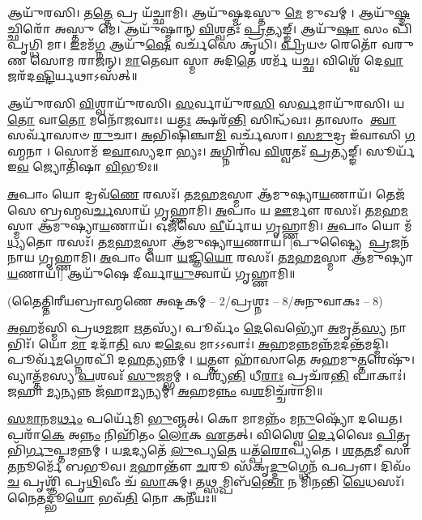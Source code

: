 𑌆𑌯𑍁᳴𑌰𑌸𑌿।
𑌤\-\ul{𑌤𑍍𑌤𑍇} 𑌪𑍍𑌰 𑌯᳴𑌚𑍍𑌛𑌾𑌮𑌿।
𑌆𑌯𑍁᳴𑌷𑍍𑌮𑌦𑌸𑍍𑌤𑍁 \ul{𑌮𑍇} 𑌮𑍁𑌖𑌮𑍍।
𑌆𑌯𑍁᳴\-\ul{𑌷𑍍𑌮}\-𑌚𑍍𑌛𑌿𑌰𑍋᳴ 𑌅𑌸𑍍𑌤𑍁 𑌮𑍇।
𑌆𑌯𑍁᳴𑌷𑍍𑌮𑌾𑌨𑍍 \ul{𑌵𑌿}\-𑌶𑍍𑌵𑌤𑌃᳴ \ul{𑌪𑍍𑌰}\-𑌤𑍍𑌯𑌙𑍍𑌙𑍍।
𑌆𑌯𑍁᳴\-\ul{𑌷𑌾} 𑌸𑌂 𑌪𑌿᳴𑌪𑍃𑌗𑍍𑌧𑌿 𑌮𑌾।
\-\ul{𑌇}\-𑌮𑌮᳴\-\ul{𑌗𑍍𑌨} 𑌆𑌯𑍁᳴\-\ul{𑌷𑍇} 𑌵𑌰𑍍𑌚᳴𑌸𑍇 𑌕𑍃𑌧𑌿।
\-\ul{𑌪𑍍𑌰𑌿}\-𑌯𑍞 𑌰𑍇𑌤𑍋᳴ 𑌵𑌰𑍁𑌣 𑌸𑍋𑌮 𑌰𑌾𑌜𑌨𑍍।
\-\ul{𑌮𑌾}\-𑌤𑍇𑌵𑌾𑌸𑍍𑌮𑌾 𑌅𑌦𑌿\-\ul{𑌤𑍇} 𑌶𑌰𑍍𑌮᳴ 𑌯𑌚𑍍𑌛।
𑌵𑌿𑌶𑍍𑌵𑍇᳴ 𑌦𑍇\-\ul{𑌵𑌾} 𑌜𑌰᳴𑌦\-\ul{𑌷𑍍𑌟𑌿}\-𑌰𑍍𑌯𑌥𑌾𑌽𑌸᳴𑌤𑍍॥

𑌆𑌯𑍁᳴𑌰𑌸𑌿 \ul{𑌵𑌿}\-𑌶𑍍𑌵𑌾𑌯𑍁᳴𑌰𑌸𑌿।
\-\ul{𑌸}\-𑌰𑍍𑌵𑌾𑌯𑍁᳴𑌰\-\ul{𑌸𑌿} 𑌸\-\ul{𑌰𑍍𑌵}\-𑌮𑌾𑌯𑍁᳴𑌰𑌸𑌿।
𑌯\-\ul{𑌤𑍋} 𑌵𑌾\-\ul{𑌤𑍋} 𑌮𑌨𑍋᳴𑌜𑌵𑌾𑌃।
𑌯\-\ul{𑌤𑌃} 𑌕𑍍𑌷𑌰᳴\-\ul{𑌨𑍍𑌤𑌿} 𑌸𑌿𑌨𑍍𑌧᳴𑌵𑌃।
𑌤𑌾𑌸𑌾𑌂 \ul{𑌤𑍍𑌵𑌾} 𑌸𑌰𑍍𑌵𑌾᳴𑌸𑌾𑍞 \ul{𑌰𑍁}\-𑌚𑌾।
\-\ul{𑌅}\-𑌭𑌿𑌷𑌿᳴𑌞𑍍𑌚𑌾\-\ul{𑌮𑌿} 𑌵𑌰𑍍𑌚᳴𑌸𑌾।
\-\ul{𑌸}\-\-\ul{𑌮𑍁}\-𑌦𑍍𑌰 𑌇᳴𑌵𑌾𑌸𑌿 \ul{𑌗}\-𑌹𑍍𑌮𑌨𑌾।
𑌸𑍋𑌮᳴ 𑌇\-\ul{𑌵𑌾}\-𑌸𑍍𑌯𑌦𑌾𑌭𑍍𑌯𑌃।
\-\ul{𑌅}\-𑌗𑍍𑌨𑌿𑌰𑌿᳴𑌵 \ul{𑌵𑌿}\-𑌶𑍍𑌵𑌤𑌃᳴ \ul{𑌪𑍍𑌰}\-𑌤𑍍𑌯𑌙𑍍𑌙𑍍।
𑌸𑍂𑌰𑍍𑌯᳴ 𑌇\-\ul{𑌵} 𑌜𑍍𑌯𑍋𑌤𑌿᳴𑌷𑌾 \ul{𑌵𑌿}\-𑌭𑍂𑌃॥


\-\ul{𑌅}\-𑌪𑌾𑌂 𑌯𑍋 𑌦𑍍𑌰𑌵᳴\-\ul{𑌣𑍇} 𑌰𑌸𑌃᳴।
𑌤\-\ul{𑌮}\-𑌹\-\ul{𑌮}\-𑌸𑍍𑌮𑌾 𑌆᳴𑌮𑍁𑌷𑍍𑌯𑌾\-\ul{𑌯}\-𑌣𑌾𑌯᳴।
𑌤𑍇𑌜᳴𑌸𑍇 𑌬𑍍𑌰𑌹𑍍𑌮𑌵\-\ul{𑌰𑍍𑌚}\-𑌸𑌾𑌯᳴ 𑌗𑍃𑌹𑍍𑌣𑌾𑌮𑌿।
\-\ul{𑌅}\-𑌪𑌾𑌂 𑌯 \ul{𑌊}\-𑌰𑍍𑌮𑍗 𑌰𑌸𑌃᳴।
𑌤\-\ul{𑌮}\-𑌹\-\ul{𑌮}\-𑌸𑍍𑌮𑌾 𑌆᳴𑌮𑍁𑌷𑍍𑌯𑌾\-\ul{𑌯}\-𑌣𑌾𑌯᳴।
𑌓𑌜᳴𑌸𑍇 \ul{𑌵𑍀}\-𑌰𑍍𑌯𑌾᳴𑌯 𑌗𑍃𑌹𑍍𑌣𑌾𑌮𑌿।
\-\ul{𑌅}\-𑌪𑌾𑌂 𑌯𑍋 𑌮᳴\-\ul{𑌧𑍍𑌯}\-𑌤𑍋 𑌰𑌸𑌃᳴।
𑌤\-\ul{𑌮}\-𑌹\-\ul{𑌮}\-𑌸𑍍𑌮𑌾 𑌆᳴𑌮𑍁𑌷𑍍𑌯𑌾\-\ul{𑌯}\-𑌣𑌾𑌯᳴।
[𑌪𑍁𑌷𑍍𑌟𑍍𑌯𑍈 \ul{𑌪𑍍𑌰}\-𑌜𑌨᳴𑌨𑌾𑌯 𑌗𑍃𑌹𑍍𑌣𑌾𑌮𑌿।
\-\ul{𑌅}\-𑌪𑌾𑌂 𑌯𑍋 \ul{𑌯}\-𑌜𑍍𑌞𑌿\-\ul{𑌯𑍋} 𑌰𑌸𑌃᳴।
𑌤\-\ul{𑌮}\-𑌹\-\ul{𑌮}\-𑌸𑍍𑌮𑌾 𑌆᳴𑌮𑍁𑌷𑍍𑌯𑌾\-\ul{𑌯}\-𑌣𑌾𑌯᳴।]
𑌆𑌯𑍁᳴𑌷𑍇 𑌦𑍀𑌰𑍍𑌘𑌾\-\ul{𑌯𑍁}\-𑌤𑍍𑌵𑌾𑌯᳴ 𑌗𑍃𑌹𑍍𑌣𑌾𑌮𑌿॥

\centerline{\scriptsize (𑌤𑍈𑌤𑍍𑌤𑌿𑌰𑍀𑌯𑌬𑍍𑌰𑌾𑌹𑍍𑌮𑌣𑍇 𑌅𑌷𑍍𑌟𑌕𑌮𑍍 – 2/𑌪𑍍𑌰𑌶𑍍𑌨𑌃 – 8/𑌅𑌨𑍁𑌵𑌾𑌕𑌃 – 8)}
\-\ul{𑌅}\-𑌹𑌮᳴𑌸𑍍𑌮𑌿 𑌪𑍍𑌰𑌥\-\ul{𑌮}\-𑌜𑌾 \ul{𑌋}\-𑌤𑌸𑍍𑌯᳴।
𑌪𑍂𑌰𑍍𑌵𑌂᳴ \ul{𑌦𑍇}\-𑌵𑍇𑌭𑍍𑌯𑍋᳴ \ul{𑌅}\-𑌮𑍃𑌤᳴\-\ul{𑌸𑍍𑌯} 𑌨𑌾𑌭𑌿𑌃᳴।
𑌯𑍋 \ul{𑌮𑌾} 𑌦𑌦𑌾᳴\-\ul{𑌤𑌿} 𑌸 𑌇\-\ul{𑌦𑍇}\-𑌵 𑌮𑌾𑌽𑌽𑌵𑌾𑌃॑।
\-\ul{𑌅}\-𑌹𑌮\-\ul{𑌨𑍍𑌨}\-𑌮𑌨𑍍𑌨᳴\-\ul{𑌮}\-𑌦𑌨𑍍𑌤᳴𑌮𑌦𑍍𑌮𑌿।
𑌪𑍂𑌰𑍍𑌵᳴\-\ul{𑌮}\-𑌗𑍍𑌨𑍇𑌰𑌪𑌿᳴ 𑌦\-\ul{𑌹}\-𑌤𑍍𑌯𑌨𑍍𑌨𑌮𑍍।
\-\ul{𑌯}\-𑌤𑍍𑌤𑍗 𑌹𑌾᳴𑌸𑌾𑌤𑍇 𑌅𑌹𑌮𑍁\-\ul{𑌤𑍍𑌤}\-𑌰𑍇𑌷𑍁᳴।
𑌵𑍍𑌯𑌾𑌤𑍍𑌤᳴𑌮𑌸𑍍𑌯 \ul{𑌪}\-𑌶𑌵𑌃᳴ \ul{𑌸𑍁}\-𑌜𑌮𑍍𑌭𑌮𑍍।
𑌪𑌶𑍍𑌯᳴\-\ul{𑌨𑍍𑌤𑌿} 𑌧𑍀\-\ul{𑌰𑌾𑌃} 𑌪𑍍𑌰𑌚᳴𑌰\-\ul{𑌨𑍍𑌤𑌿} 𑌪𑌾𑌕𑌾𑌃॑।
𑌜𑌹𑌾\-\ul{𑌮𑍍𑌯}\-𑌨𑍍𑌯𑌨𑍍𑌨 𑌜᳴𑌹𑌾\-\ul{𑌮𑍍𑌯}\-𑌨𑍍𑌯𑌮𑍍।
\-\ul{𑌅}\-𑌹𑌮\-\ul{𑌨𑍍𑌨𑌂} 𑌵\-\ul{𑌶}\-𑌮𑌿𑌚𑍍𑌚᳴𑌰𑌾𑌮𑌿॥

\-\ul{𑌸}\-\-\ul{𑌮𑌾}\-𑌨𑌮\-\ul{𑌰𑍍𑌥𑌂} 𑌪𑌰𑍍𑌯𑍇᳴𑌮𑌿 \ul{𑌭𑍁}\-𑌞𑍍𑌜𑌤𑍍।
𑌕𑍋 𑌮𑌾𑌮𑌨𑍍𑌨𑌂᳴ 𑌮\-\ul{𑌨𑍁}\-𑌷𑍍𑌯𑍋᳴ 𑌦𑌯𑍇𑌤।
𑌪𑌰𑌾᳴\-\ul{𑌕𑍇} 𑌅\-\ul{𑌨𑍍𑌨𑌂} 𑌨𑌿𑌹𑌿᳴𑌤𑌂 \ul{𑌲𑍋}\-𑌕 \ul{𑌏}\-𑌤𑌤𑍍।
𑌵𑌿𑌶𑍍𑌵𑍈\-\ul{𑌰𑍍𑌦𑍇}\-𑌵𑍈𑌃 \ul{𑌪𑌿}\-𑌤𑍃𑌭𑌿᳴\-\ul{𑌰𑍍𑌗𑍁}\-𑌪𑍍𑌤𑌮𑌨𑍍𑌨𑌮𑍍।
𑌯\-\ul{𑌦}\-𑌦𑍍𑌯𑌤𑍇᳴ \ul{𑌲𑍁}\-𑌪𑍍𑌯\-\ul{𑌤𑍇} 𑌯𑌤𑍍𑌪᳴\-\ul{𑌰𑍋}\-𑌪𑍍𑌯𑌤𑍇।
\-\ul{𑌶}\-\-\ul{𑌤}\-\-\ul{𑌤}\-𑌮𑍀 𑌸𑌾 \ul{𑌤}\-𑌨𑍂𑌰𑍍𑌮𑍇᳴ 𑌬𑌭𑍂𑌵।
\-\ul{𑌮}\-𑌹𑌾𑌨𑍍𑌤𑍗᳴ \ul{𑌚}\-𑌰𑍂 𑌸᳴𑌕𑍃\-\ul{𑌦𑍍𑌦𑍁}\-𑌗𑍍𑌧𑍇𑌨᳴ 𑌪𑌪𑍍𑌰𑍗।
𑌦𑌿𑌵𑌂᳴ \ul{𑌚} 𑌪𑍃𑌶𑍍𑌞𑌿᳴ 𑌪𑍃\-\ul{𑌥𑌿}\-𑌵𑍀𑌂 𑌚᳴ \ul{𑌸𑌾}\-𑌕𑌮𑍍।
𑌤\-\ul{𑌥𑍍𑌸}\-𑌮𑍍𑌪𑌿𑌬᳴\-\ul{𑌨𑍍𑌤𑍋} 𑌨 𑌮𑌿᳴𑌨𑌨𑍍𑌤𑌿 \ul{𑌵𑍇}\-𑌧𑌸𑌃᳴।
𑌨𑍈𑌤𑌦𑍍𑌭𑍂\-\ul{𑌯𑍋} 𑌭𑌵᳴\-\ul{𑌤𑌿} 𑌨𑍋 𑌕𑌨𑍀᳴𑌯𑌃॥

